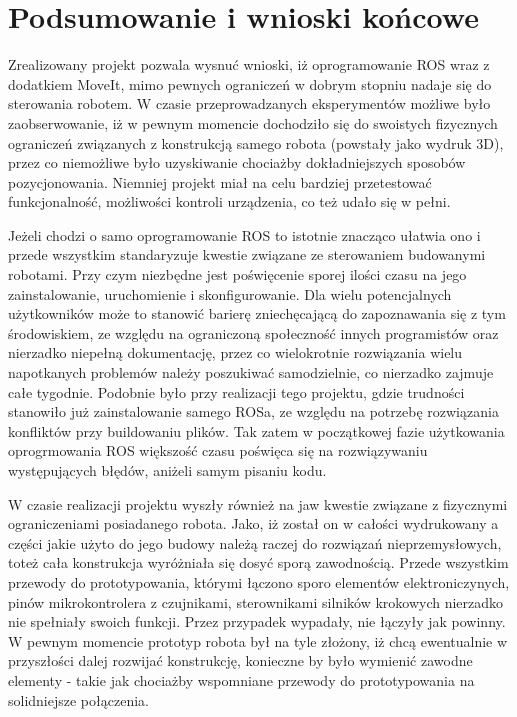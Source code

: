 \chapter{Podsumowanie i wnioski końcowe}

Zrealizowany projekt pozwala wysnuć wnioski, iż oprogramowanie ROS wraz z dodatkiem MoveIt, mimo pewnych ograniczeń w dobrym stopniu nadaje się do sterowania robotem. W czasie przeprowadzanych eksperymentów możliwe było zaobserwowanie, iż w pewnym momencie dochodziło się do swoistych fizycznych ograniczeń związanych z konstrukcją samego robota (powstały jako wydruk 3D), przez co niemożliwe było uzyskiwanie chociażby dokładniejszych sposobów pozycjonowania. Niemniej projekt miał na celu bardziej przetestować funkcjonalność, możliwości kontroli urządzenia, co też udało się w pełni. 

Jeżeli chodzi o samo oprogramowanie ROS to istotnie znacząco ułatwia ono i przede wszystkim standaryzuje kwestie związane ze sterowaniem budowanymi robotami. Przy czym niezbędne jest poświęcenie sporej ilości czasu na jego zainstalowanie, uruchomienie i skonfigurowanie. Dla wielu potencjalnych użytkowników może to stanowić barierę zniechęcającą do zapoznawania się z tym środowiskiem, ze względu na ograniczoną społeczność innych programistów oraz nierzadko niepełną dokumentację, przez co wielokrotnie rozwiązania wielu napotkanych problemów należy poszukiwać samodzielnie, co nierzadko zajmuje całe tygodnie. Podobnie było przy realizacji tego projektu, gdzie trudności stanowiło już zainstalowanie samego ROSa, ze względu na potrzebę rozwiązania konfliktów przy buildowaniu plików. Tak zatem w początkowej fazie użytkowania oprogrmowania ROS większość czasu poświęca się na rozwiązywaniu występujących błędów, aniżeli samym pisaniu kodu.

W czasie realizacji projektu wyszły również na jaw kwestie związane z fizycznymi ograniczeniami posiadanego robota. Jako, iż został on w całości wydrukowany a części jakie użyto do jego budowy należą raczej do rozwiązań nieprzemysłowych, toteż cała konstrukcja wyróżniała się dosyć sporą zawodnością. Przede wszystkim przewody do prototypowania, którymi łączono sporo elementów elektroniczynych, pinów mikrokontrolera z czujnikami, sterownikami silników krokowych nierzadko nie spełniały swoich funkcji. Przez przypadek wypadały, nie łączyły jak powinny. W pewnym momencie prototyp robota był na tyle złożony, iż chcą ewentualnie w przyszłości dalej rozwijać konstrukcję, konieczne by było wymienić zawodne elementy - takie jak chociażby wspomniane przewody do prototypowania na solidniejsze połączenia.

